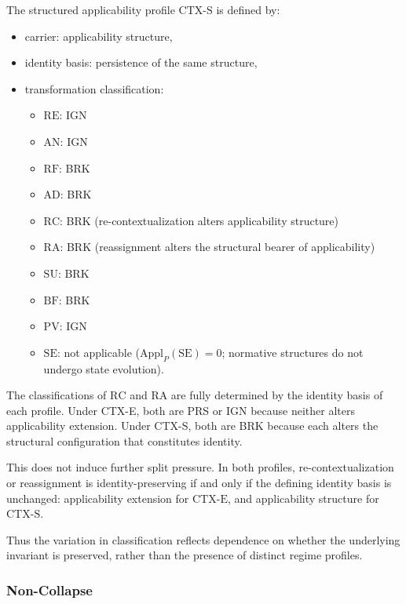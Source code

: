 \begin{definition}
The structured applicability profile $\mathrm{CTX\mbox{-}S}$ is defined by:
\begin{itemize}
\item carrier: applicability structure,
\item identity basis: persistence of the same structure,
\item transformation classification:
\begin{itemize}
  \item $\mathrm{RE}$: IGN
  \item $\mathrm{AN}$: IGN
  \item $\mathrm{RF}$: BRK
  \item $\mathrm{AD}$: BRK
  \item $\mathrm{RC}$: BRK \quad (re-contextualization alters
        applicability structure)
  \item $\mathrm{RA}$: BRK \quad (reassignment alters the structural
        bearer of applicability)
  \item $\mathrm{SU}$: BRK
  \item $\mathrm{BF}$: BRK
  \item $\mathrm{PV}$: IGN
  \item $\mathrm{SE}$: not applicable
      ($\mathrm{Appl}_P(\mathrm{SE}) = 0$;
      normative structures do not undergo state evolution).
\end{itemize}
\end{itemize}
\end{definition}


The classifications of $\mathrm{RC}$ and $\mathrm{RA}$ are fully determined
by the identity basis of each profile. Under CTX-E, both are PRS or IGN
because neither alters applicability extension. Under CTX-S, both are BRK
because each alters the structural configuration that constitutes identity.

This does not induce further split pressure.
In both profiles, re-contextualization or reassignment is identity-preserving
if and only if the defining identity basis is unchanged:
applicability extension for $\mathrm{CTX\mbox{-}E}$,
and applicability structure for $\mathrm{CTX\mbox{-}S}$.

Thus the variation in classification reflects dependence on whether the
underlying invariant is preserved, rather than the presence of distinct
regime profiles.


\subsubsection{Non-Collapse}

